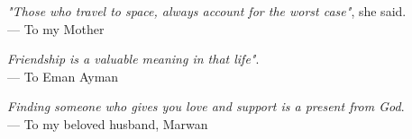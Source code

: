 \thispagestyle{empty}
{}

\vspace*{3cm}

\begin{center}
    \emph{"Those who travel to space, always account for the worst case"}, she said. \\  \medskip
    --- To my Mother    
\end{center}

\medskip

\begin{center}
    \emph{Friendship is a valuable meaning in that life"}. \\  \medskip
    --- To Eman Ayman    
\end{center}

\medskip

\begin{center}
    \emph{Finding someone who gives you love and support is a present from God}. \\  \medskip
    --- To my beloved husband, Marwan    
\end{center}
